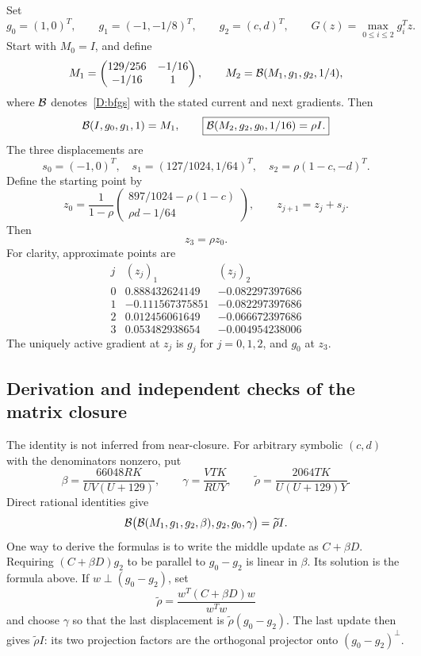 Set
\[
 g_0=(1,0)^T,\qquad g_1=(-1,-1/8)^T,\qquad g_2=(c,d)^T,
 \qquad G(z)=\max_{0\le i\le2}g_i^Tz.
\]
Start with $M_0=I$, and define
\[
 M_1=\begin{pmatrix}129/256&-1/16\\-1/16&1\end{pmatrix},
 \qquad M_2=\mathcal B(M_1,g_1,g_2,1/4),
\]
where $\mathcal B$ denotes~\eqref{D:bfgs} with the stated current and next gradients. Then
\begin{equation}\label{D:closure}
 \mathcal B(I,g_0,g_1,1)=M_1,\qquad
 \boxed{\mathcal B(M_2,g_2,g_0,1/16)=\rho I.}
\end{equation}
The three displacements are
\begin{equation}\label{D:steps}
 s_0=(-1,0)^T,\quad s_1=(127/1024,1/64)^T,\quad
 s_2=\rho(1-c,-d)^T.
\end{equation}
Define the starting point by
\begin{equation}\label{D:x0}
 z_0=\frac1{1-\rho}
 \begin{pmatrix}897/1024-\rho(1-c)\\ \rho d-1/64\end{pmatrix},
 \qquad z_{j+1}=z_j+s_j.
\end{equation}
Then
\[
 \boxed{z_3=\rho z_0.}
\]
For clarity, approximate points are
\[
\begin{array}{c|rr}
 j& (z_j)_1&(z_j)_2\\\hline
0& 0.888432624149&-0.082297397686\\
1&-0.111567375851&-0.082297397686\\
2& 0.012456061649&-0.066672397686\\
3& 0.053482938654&-0.004954238006
\end{array}
\]
The uniquely active gradient at $z_j$ is $g_j$ for $j=0,1,2$, and $g_0$ at $z_3$.

\subsection{Derivation and independent checks of the matrix closure}
The identity is not inferred from near-closure. For arbitrary symbolic $(c,d)$ with the denominators nonzero, put
\[
 \beta=\frac{66048RK}{UV(U+129)},\qquad
 \gamma=\frac{VTK}{RUY},\qquad
 \widetilde\rho=\frac{2064TK}{U(U+129)Y}.
\]
Direct rational identities give
\[
 \mathcal B\bigl(\mathcal B(M_1,g_1,g_2,\beta),g_2,g_0,\gamma\bigr)
 =\widetilde\rho I.
\]
One way to derive the formulas is to write the middle update as $C+\beta D$. Requiring $(C+\beta D)g_2$ to be parallel to $g_0-g_2$ is linear in $\beta$. Its solution is the formula above. If $w\perp(g_0-g_2)$, set
\[
 \widetilde\rho=\frac{w^T(C+\beta D)w}{w^Tw}
\]
and choose $\gamma$ so that the last displacement is $\widetilde\rho(g_0-g_2)$. The last update then gives $\widetilde\rho I$: its two projection factors are the orthogonal projector onto $(g_0-g_2)^\perp$.

